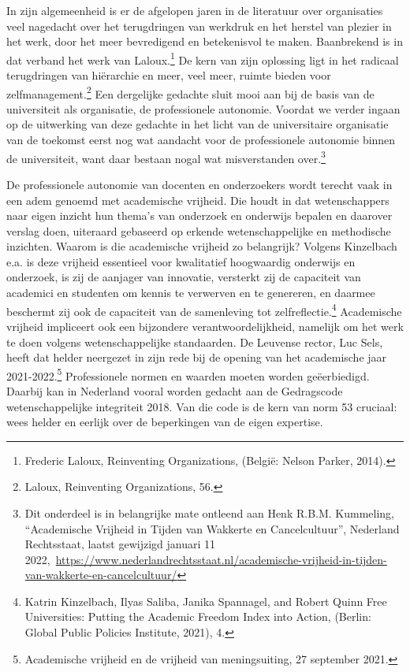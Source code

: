 \documentclass{jote-book}
\begin{document}
	In zijn algemeenheid is er de afgelopen jaren in de literatuur over organisaties veel nagedacht over het terugdringen van werkdruk en het herstel van plezier in het werk, door het meer bevredigend en betekenisvol te maken. Baanbrekend is in dat verband het werk van Laloux.\footnote{Frederic Laloux, Reinventing Organizations, (België: Nelson Parker, 2014).} De kern van zijn oplossing ligt in het radicaal terugdringen van hiërarchie en meer, veel meer, ruimte bieden voor zelfmanagement.\footnote{Laloux, Reinventing Organizations, 56.} Een dergelijke gedachte sluit mooi aan bij de basis van de universiteit als organisatie, de professionele autonomie. Voordat we verder ingaan op de uitwerking van deze gedachte in het licht van de universitaire organisatie van de toekomst eerst nog wat aandacht voor de professionele autonomie binnen de universiteit, want daar bestaan nogal wat misverstanden over.\footnote{Dit onderdeel is in belangrijke mate ontleend aan Henk R.B.M. Kummeling, “Academische Vrijheid in Tijden van Wakkerte en Cancelcultuur”, Nederland Rechtsstaat, laatst gewijzigd januari 11 2022, \href{https://www.nederlandrechtsstaat.nl/academische-vrijheid-in-tijden-van-wakkerte-en-cancelcultuur/}{https://www.nederlandrechtsstaat.nl/academische-vrijheid-in-tijden-van-wakkerte-en-cancelcultuur/}}



	De professionele autonomie van docenten en onderzoekers wordt terecht vaak in een adem genoemd met academische vrijheid. Die houdt in dat wetenschappers naar eigen inzicht hun thema's van onderzoek en onderwijs bepalen en daarover verslag doen, uiteraard gebaseerd op erkende wetenschappelijke en methodische inzichten. Waarom is die academische vrijheid zo belangrijk? Volgens Kinzelbach e.a. is deze vrijheid essentieel voor kwalitatief hoogwaardig onderwijs en onderzoek, is zij de aanjager van innovatie, versterkt zij de capaciteit van academici en studenten om kennis te verwerven en te genereren, en daarmee beschermt zij ook de capaciteit van de samenleving tot zelfreflectie.\footnote{Katrin Kinzelbach, Ilyas Saliba, Janika Spannagel, and Robert Quinn Free Universities: Putting the Academic Freedom Index into Action, (Berlin: Global Public Policies Institute, 2021), 4.} Academische vrijheid impliceert ook een bijzondere verantwoordelijkheid, namelijk om het werk te doen volgens wetenschappelijke standaarden. De Leuvense rector, Luc Sels, heeft dat helder neergezet in zijn rede bij de opening van het academische jaar 2021-2022.\footnote{Academische vrijheid en de vrijheid van meningsuiting, 27 september 2021.} Professionele normen en waarden moeten worden geëerbiedigd. Daarbij kan in Nederland vooral worden gedacht aan de Gedragscode wetenschappelijke integriteit 2018. Van die code is de kern van norm 53 cruciaal: wees helder en eerlijk over de beperkingen van de eigen expertise.
\end{document}
